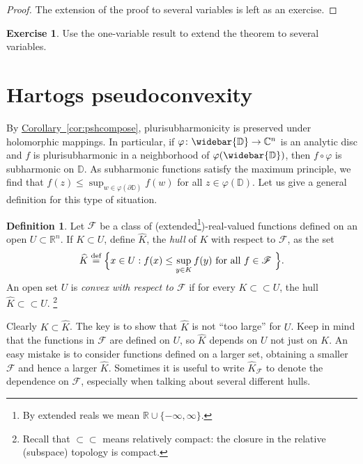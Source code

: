 \documentclass[12pt,openany]{book}
\newcommand{\C}{{\mathbb{C}}}
\newcommand{\R}{{\mathbb{R}}}
\newcommand{\D}{{\mathbb{D}}}
\newcommand{\sF}{{\mathscr{F}}}
\newcommand{\myindex}[1]{#1\index{#1}}
\theoremstyle{plain}
\theoremstyle{remark}
\theoremstyle{definition}
\newtheorem{defn}[thm]{Definition}
\newenvironment{exbox}{%
    \def\FrameCommand{\vrule width 1pt \relax\hspace{10pt}}%
    \MakeFramed{\advance\hsize-\width\FrameRestore}%
}{%
    \endMakeFramed
}
\theoremstyle{exercise}
\newtheorem{exercise}{Exercise}[section]
\theoremstyle{example}
\newcommand{\corref}[1]{\hyperref[#1]{Corollary~\ref*{#1}}}
\begin{document}
\begin{proof}
The extension of the proof to several variables is left as an exercise.
\end{proof}

\begin{exbox}
\begin{exercise}
Use the one-variable result to extend the theorem to several variables.
\end{exercise}
\end{exbox}


\section{Hartogs pseudoconvexity}

By \corref{cor:pshcompose},
plurisubharmonicity is preserved under holomorphic mappings.
In particular, if $\varphi \colon \widebar{\D} \to
\C^n$ is an analytic disc and $f$ is plurisubharmonic in a neighborhood of
$\varphi(\widebar{\D})$, then $f \circ \varphi$ is subharmonic on $\D$.
As subharmonic functions satisfy the maximum principle, we find
that $f(z) \leq \sup_{w \in \varphi(\partial \D)} f(w)$ for
all $z \in \varphi(\D)$.  Let us give a general definition
for this type of situation.

\begin{defn}
Let $\sF$ be a class of (extended\footnote{%
By extended reals we mean $\R \cup \{ -\infty,\infty\}$.})-real-valued
functions defined on an open $U \subset \R^n$.  If $K
\subset U$, define $\widehat{K}$, the \emph{\myindex{hull}} of $K$ with
respect to $\sF$, as the set
%
\begin{equation*}
\widehat{K} \overset{\text{def}}{=} \Bigl\{ x \in U : f(x) \leq \sup_{y\in K} f(y)
\text{ for all $f \in \sF$ } \Bigr\} .
\end{equation*}
An open set $U$ is \emph{convex with respect to $\sF$}\index{convex!with respect to $\sF$}
if for every $K \subset \subset U$, the hull $\widehat{K} \subset \subset U$.%
\footnote{Recall that $\subset \subset$ means relatively compact:
the closure in the relative (subspace) topology is compact.}
\end{defn}

Clearly $K \subset \widehat{K}$.  The key is to show that $\widehat{K}$
is not ``too large'' for $U$.
Keep in mind that the functions in $\sF$ are defined on $U$, so $\widehat{K}$
depends on $U$ not just on $K$.  An easy mistake is to consider functions defined
on a larger set, obtaining a smaller $\sF$ and hence a larger
$\widehat{K}$.  Sometimes it is useful to write $\widehat{K}_{\sF}$ to
denote the dependence on $\sF$, especially when talking about several different
hulls.
\end{document}
